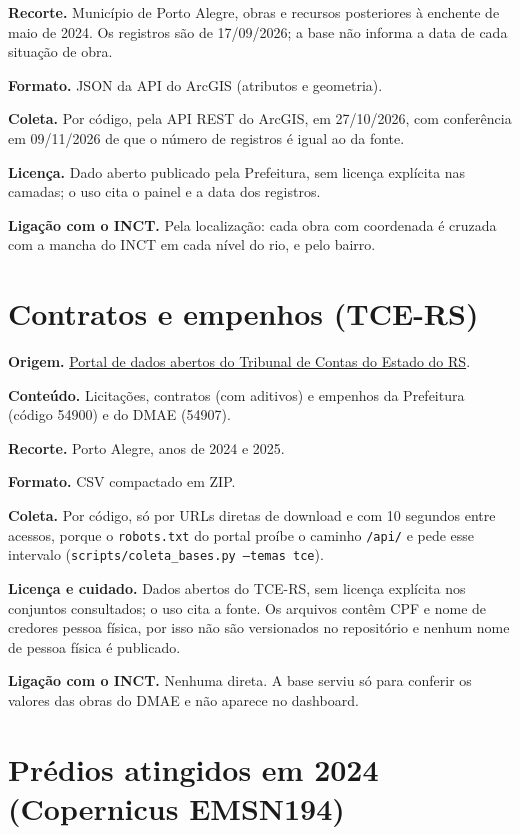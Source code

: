 \documentclass[11pt,a4paper]{article}
\newcommand{\campo}[1]{\texttt{#1}}
\begin{document}
\textbf{Recorte.} Município de Porto Alegre, obras e recursos posteriores à enchente de maio de 2024. Os registros são de 17/09/2026; a base não informa a data de cada situação de obra.

\textbf{Formato.} JSON da API do ArcGIS (atributos e geometria).

\textbf{Coleta.} Por código, pela API REST do ArcGIS, em 27/10/2026, com conferência em 09/11/2026 de que o número de registros é igual ao da fonte.

\textbf{Licença.} Dado aberto publicado pela Prefeitura, sem licença explícita nas camadas; o uso cita o painel e a data dos registros.

\textbf{Ligação com o INCT.} Pela localização: cada obra com coordenada é cruzada com a mancha do INCT em cada nível do rio, e pelo bairro.

\section{Contratos e empenhos (TCE-RS)}

\textbf{Origem.} \href{https://dados.tce.rs.gov.br}{Portal de dados abertos do Tribunal de Contas do Estado do RS}.

\textbf{Conteúdo.} Licitações, contratos (com aditivos) e empenhos da Prefeitura (código 54900) e do DMAE (54907).

\textbf{Recorte.} Porto Alegre, anos de 2024 e 2025.

\textbf{Formato.} CSV compactado em ZIP.

\textbf{Coleta.} Por código, só por URLs diretas de download e com 10 segundos entre acessos, porque o \campo{robots.txt} do portal proíbe o caminho \campo{/api/} e pede esse intervalo (\campo{scripts/coleta\_bases.py --temas tce}).

\textbf{Licença e cuidado.} Dados abertos do TCE-RS, sem licença explícita nos conjuntos consultados; o uso cita a fonte. Os arquivos contêm CPF e nome de credores pessoa física, por isso não são versionados no repositório e nenhum nome de pessoa física é publicado.

\textbf{Ligação com o INCT.} Nenhuma direta. A base serviu só para conferir os valores das obras do DMAE e não aparece no dashboard.

\section{Prédios atingidos em 2024 (Copernicus EMSN194)}
\end{document}

